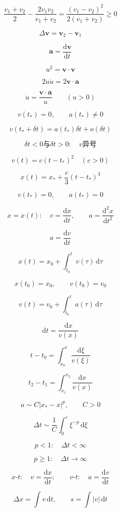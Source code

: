 \documentclass[12pt]{article}
\begin{document}
\[
\frac{v_1+v_2}{2}-\frac{2v_1v_2}{v_1+v_2} =\frac{(v_1-v_2)^2}{2(v_1+v_2)}\ge0
\]

\[
\Delta\boldsymbol v=\boldsymbol v_2-\boldsymbol v_1
\]

\[
\boldsymbol a=\frac{\mathrm d\boldsymbol v}{\mathrm dt}
\]

\[
u^2=\boldsymbol v\cdot\boldsymbol v
\]

\[
2u\dot u=2\boldsymbol v\cdot\boldsymbol a
\]

\[
\dot u=\frac{\boldsymbol v\cdot\boldsymbol a}{u}\qquad(u>0)
\]

\[
v(t_*)=0,\qquad a(t_*)\ne0
\]

\[
v(t_*+\delta t)=a(t_*)\delta t+o(\delta t)
\]

\[
\delta t<0\text{与}\delta t>0:\quad v\text{异号}
\]

\[
v(t)=c(t-t_*)^2\quad(c>0)
\]

\[
x(t)=x_*+\frac c3(t-t_*)^3
\]

\[
v(t_*)=0,\qquad a(t_*)=0
\]

\[
x=x(t):\quad v=\frac{\mathrm dx}{\mathrm dt},\qquad a=\frac{\mathrm d^2x}{\mathrm dt^2}
\]

\[
a=\frac{\mathrm dv}{\mathrm dt}
\]

\[
x(t)=x_0+\int_{t_0}^t v(\tau)\,\mathrm d\tau
\]

\[
x(t_0)=x_0,\qquad v(t_0)=v_0
\]

\[
v(t)=v_0+\int_{t_0}^t a(\tau)\,\mathrm d\tau
\]

\[
\mathrm dt=\frac{\mathrm dx}{v(x)}
\]

\[
t-t_0=\int_{x_0}^x\frac{\mathrm d\xi}{v(\xi)}
\]

\[
t_2-t_1=\int_{x_1}^{x_2}\frac{\mathrm dx}{v(x)}
\]

\[
u\sim C|x_*-x|^p,\qquad C>0
\]

\[
\Delta t\sim\frac1C\int_0^\varepsilon \xi^{-p}\,\mathrm d\xi
\]

\[
p<1:\quad\Delta t<\infty
\]

\[
p\ge1:\quad\Delta t\to\infty
\]

\[
x\text{-}t:\quad v=\frac{\mathrm dx}{\mathrm dt}; \qquad v\text{-}t:\quad a=\frac{\mathrm dv}{\mathrm dt}
\]

\[
\Delta x=\int v\,\mathrm dt,\qquad s=\int |v|\,\mathrm dt
\]
\end{document}
